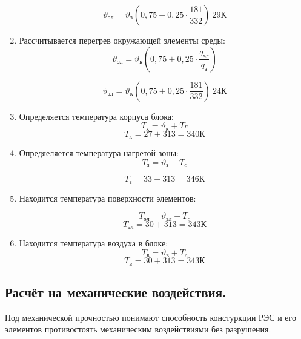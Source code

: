 \begin{enumerate}
  $$\vartheta_{эл} = \vartheta_{з}\left(0,75 + 0,25 \cdot \frac{181}{332}\right) ~ 29К$$

\item Рассчитывается перегрев окружающей элементы среды:
  \begin{equation}
    \vartheta_{эл} = \vartheta_{к}\left(0,75 + 0,25 \cdot \frac{q_{эл}}{q_{з}}\right)
  \end{equation}

  $$\vartheta_{эл} = \vartheta_{к}\left(0,75 + 0,25 \cdot \frac{181}{332}\right) ~ 24К$$

\item Определяется температура корпуса блока:
  \begin{equation}
  T_к = \vartheta_к +  Tc
\end{equation}
$$  T_к = 27 + 313 = 340 К$$
\item Опредяеляется температура нагретой зоны:
  \begin{equation}
  T_з = \vartheta_з +  T_c
\end{equation}

$$T_з = 33 + 313 = 346 К$$
\item Находится температура поверхности элементов:  

\begin{equation}
  T_{эл} = \vartheta_{эл} + T_c
\end{equation}
$$T_{эл} = 30 + 313 = 343 К$$


\item Находится температура воздуха в блоке:
  \begin{equation}
  T_{в}   = \vartheta_{в} + T_c
\end{equation}
$$  T_{в}   = 30 + 313 = 343 К$$
\end{enumerate}

\subsection{Расчёт на механические воздействия. }


Под механической прочностью понимают способность констуркции РЭС и его
элементов противостоять механическим воздействиями без разрушения.

